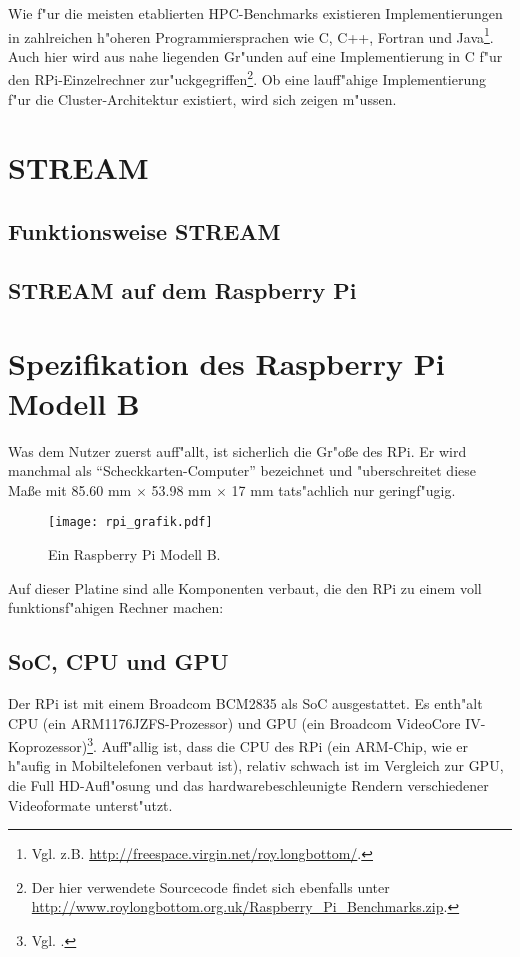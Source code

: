 Wie f"ur die meisten etablierten HPC-Benchmarks existieren Implementierungen in zahlreichen h"oheren Programmiersprachen wie C, C++, Fortran und Java\footnote{Vgl. z.B. \url{http://freespace.virgin.net/roy.longbottom/}.}. Auch hier wird aus nahe liegenden Gr"unden auf eine Implementierung in C f"ur den RPi-Einzelrechner zur"uckgegriffen\footnote{Der hier verwendete Sourcecode findet sich ebenfalls unter \url{http://www.roylongbottom.org.uk/Raspberry_Pi_Benchmarks.zip}.}. Ob eine lauff"ahige Implementierung f"ur die Cluster-Architektur existiert, wird sich zeigen m"ussen. 
\section{STREAM}\label{STREAM}
\subsection{Funktionsweise STREAM}\label{Funktionsweise STREAM}
\subsection{STREAM auf dem Raspberry Pi}\label{STREAM RPi}
\section{Spezifikation des Raspberry Pi Modell B}\label{RPi Spezifikation}

Was dem Nutzer zuerst auff"allt, ist sicherlich die Gr"o\ss e des RPi. Er wird manchmal als "`Scheckkarten-Computer"' bezeichnet und "uberschreitet diese Ma\ss e mit 85.60 mm $\times$ 53.98 mm $\times$ 17 mm tats"achlich nur geringf"ugig. 
\begin{figure}[htb]
	\centering
	\texttt{[image: rpi\_grafik.pdf]}\\ 
	\caption{Ein Raspberry Pi Modell B\cite{scrguide01}.}\label{fig:RPi-Spezifikation}
\end{figure}

\noindent Auf dieser Platine sind alle Komponenten verbaut, die den RPi zu einem voll funktionsf"ahigen Rechner machen: 

\subsection{SoC, CPU und GPU}\label{RPi Hardware}

Der RPi ist mit einem Broadcom BCM2835 als SoC ausgestattet. Es enth"alt CPU (ein ARM1176JZFS-Prozessor) und GPU (ein Broadcom VideoCore IV-Koprozessor)\footnote{Vgl. \cite{scrguide02}.}. Auff"allig ist, dass die CPU des RPi (ein ARM-Chip, wie er h"aufig in Mobiltelefonen verbaut ist), relativ schwach ist im Vergleich zur GPU, die Full HD-Aufl"osung und das hardwarebeschleunigte Rendern verschiedener Videoformate unterst"utzt. 

